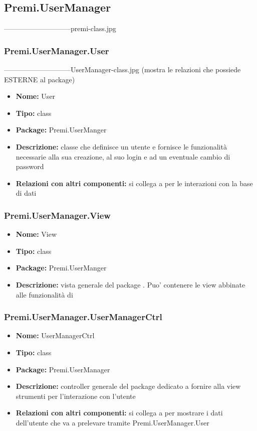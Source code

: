 \subsection{Premi.UserManager}
-----------------------------premi-class.jpg
\subsubsection{Premi.UserManager.User}
-----------------------------UserManager-class.jpg (mostra le relazioni che possiede ESTERNE al package)
\begin{itemize}
  \item \textbf{Nome:} User
  \item \textbf{Tipo:} class
  \item \textbf{Package:} Premi.UserManger
  \item \textbf{Descrizione:} classe che definisce un utente e fornisce le funzionalità necessarie alla sua creazione, al suo login e ad un eventuale cambio di password
  \item \textbf{Relazioni con altri componenti:} si collega a  per le interazioni con la base di dati
\end{itemize}

\subsubsection{Premi.UserManager.View}
\begin{itemize}
  \item \textbf{Nome:} View
  \item \textbf{Tipo:} class
  \item \textbf{Package:} Premi.UserManger
  \item \textbf{Descrizione:} vista generale del package . Puo' contenere le view abbinate alle funzionalità di 
\end{itemize}
\subsubsection{Premi.UserManager.UserManagerCtrl}
\begin{itemize}
  \item \textbf{Nome:} UserManagerCtrl
  \item \textbf{Tipo:} class
  \item \textbf{Package:} Premi.UserManager
  \item \textbf{Descrizione:} controller generale del package  dedicato a fornire alla view strumenti per l'interazione con l'utente
  \item \textbf{Relazioni con altri componenti:} si collega a  per mostrare i dati dell'utente che va a prelevare tramite {Premi.UserManager.User}
\end{itemize}
